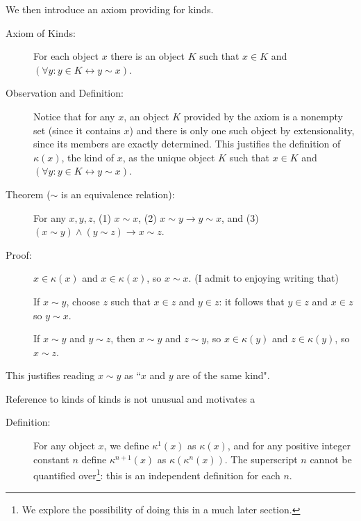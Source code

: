 \documentclass[12pt]{article}
\begin{document}
We then introduce an axiom providing for kinds.

\begin{description}

\item[Axiom of Kinds:]  For each object $x$ there is an object $K$ such that $x \in K$ and $(\forall y:y \in K \leftrightarrow y \sim x)$.

\item[Observation and Definition:]  Notice that for any $x$, an object $K$ provided by the axiom is a nonempty set (since it contains $x$)
and there is only one such object by extensionality, since its members are exactly determined.  This justifies the definition of $\kappa(x)$, the kind of $x$, as the unique object $K$ such that $x \in K$ and $(\forall y:y \in K \leftrightarrow y \sim x)$.

\item[Theorem ($\sim$ is an equivalence relation):]  For any $x,y,z$, (1) $x \sim x$, \newline (2) $x \sim y \rightarrow y \sim x$, and (3) $(x \sim y) \wedge (y \sim z) \rightarrow x \sim z$.

\item[Proof:]  $x \in \kappa(x)$ and $x \in \kappa(x)$, so $x \sim x$.  (I admit to enjoying writing that)

If $x \sim y$, choose $z$ such that $x \in z$ and $y \in z$:  it follows that $y \in z$ and $x \in z$ so $y \sim x$.

If $x \sim y$ and $y \sim z$, then $x \sim y$ and $z \sim y$, so $x \in \kappa(y)$ and $z \in \kappa(y)$, so $x \sim z$.

\end{description}

This justifies reading $x \sim y$ as ``$x$ and $y$ are of the same kind".

Reference to kinds of kinds is not unusual and motivates a
\begin{description}

\item[Definition:]  For any object $x$, we define $\kappa^1(x)$ as $\kappa(x)$,
and for any positive integer constant $n$ define $\kappa^{n+1}(x)$ as $\kappa(\kappa^n(x))$.  The superscript $n$ cannot be quantified over\footnote{We explore the possibility of doing this in a much later section.}:  this is an independent definition for each $n$.

\end{description}
\end{document}
